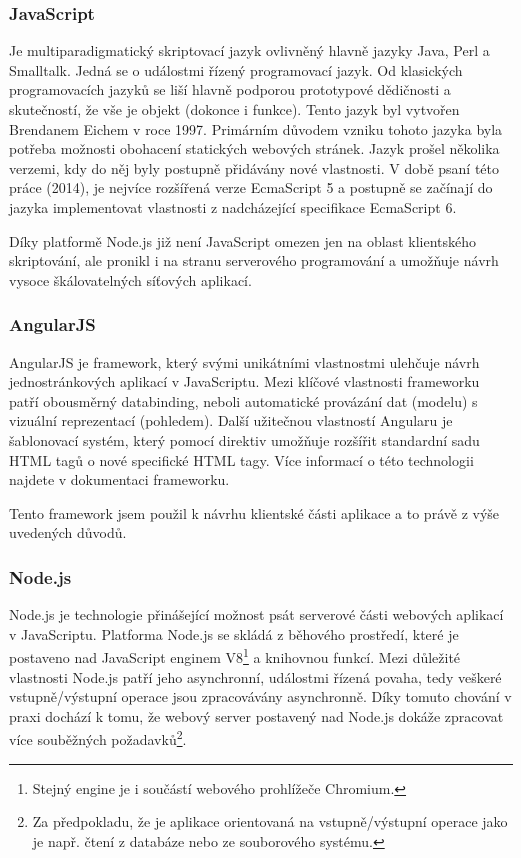 \documentclass[ing,male,java,dept460]{diploma}						%
\begin{document}
\subsubsection{JavaScript}
\label{sec:JavaScript}
Je multiparadigmatický skriptovací jazyk ovlivněný hlavně jazyky Java, Perl a Smalltalk. Jedná se o událostmi řízený programovací jazyk. Od klasických programovacích jazyků se liší hlavně podporou prototypové dědičnosti a skutečností, že vše je objekt (dokonce i funkce). Tento jazyk byl vytvořen Brendanem Eichem v roce 1997. Primárním důvodem vzniku tohoto jazyka byla potřeba možnosti obohacení statických webových stránek. Jazyk prošel několika verzemi, kdy do něj byly postupně přidávány nové vlastnosti. V době psaní této práce (2014), je nejvíce rozšířená verze EcmaScript 5 a postupně se začínají do jazyka implementovat vlastnosti z nadcházející specifikace EcmaScript 6.

Díky platformě Node.js již není JavaScript omezen jen na oblast klientského skriptování, ale pronikl i na stranu serverového programování a umožňuje návrh vysoce škálovatelných síťových aplikací.

\subsubsection{AngularJS}
AngularJS je framework, který svými unikátními vlastnostmi ulehčuje návrh jednostránkových aplikací v JavaScriptu. Mezi klíčové vlastnosti frameworku patří obousměrný databinding, neboli automatické provázání dat (modelu) s vizuální reprezentací (pohledem). Další užitečnou vlastností Angularu je šablonovací systém, který pomocí direktiv umožňuje rozšířit standardní sadu HTML tagů o nové specifické HTML tagy. Více informací o této technologii najdete v dokumentaci frameworku\cite{angulardocs}.

Tento framework jsem použil k návrhu klientské části aplikace a to právě z výše uvedených důvodů.

\subsubsection{Node.js}
\label{sec:NodeJs}
Node.js\cite{nodejs} je technologie přinášející možnost psát serverové části webových aplikací v JavaScriptu. Platforma Node.js se skládá z běhového prostředí, které je postaveno nad JavaScript enginem V8\footnote{Stejný engine je i součástí webového prohlížeče Chromium.} a knihovnou funkcí. Mezi důležité vlastnosti Node.js patří jeho asynchronní, událostmi řízená povaha, tedy veškeré vstupně/výstupní operace jsou zpracovávány asynchronně. Díky tomuto chování v praxi dochází k tomu, že webový server postavený nad Node.js dokáže zpracovat více souběžných požadavků\footnote{Za předpokladu, že je aplikace orientovaná na vstupně/výstupní operace jako je např. čtení z databáze nebo ze souborového systému.}.
\end{document}
